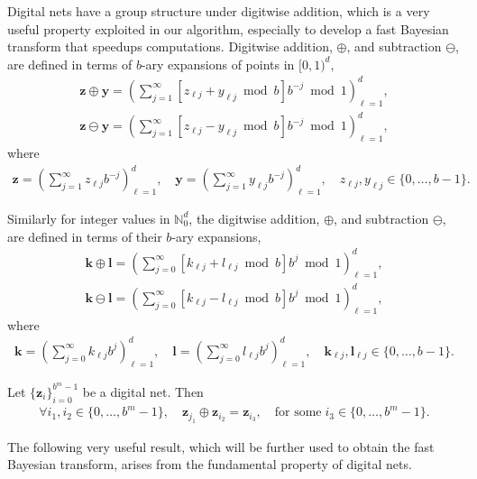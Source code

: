 \documentclass{svjour3}                     %
\newcommand{\bm}[1]{\boldsymbol{#1}}
\newcommand{\naturals}{\mathbb{N}}
\newcommand{\vk}{\bm{k}}
\newcommand{\vl}{\bm{l}}
\newcommand{\vy}{\bm{y}}
\newcommand{\vz}{\bm{z}}
\begin{document}
Digital nets have a group structure under digitwise addition, which is a very useful property exploited in our algorithm, especially to develop a fast Bayesian transform that speedups computations.
Digitwise addition, $\oplus$, and subtraction $\ominus$, are defined in terms of $b$-ary expansions of points in $[0, 1)^d$,
\begin{align*}
\vz \oplus \vy = \left( \sum_{j=1}^\infty [z_{\ell j} + y_{\ell j} \bmod b] b^{-j} \bmod 1 \right)_{\ell=1}^d,
\\
\vz \ominus \vy = \left( \sum_{j=1}^\infty [z_{\ell j} - y_{\ell j} \bmod b] b^{-j} \bmod 1 \right)_{\ell=1}^d,
\end{align*}
where
\begin{align*}
\vz = \left( \sum_{j=1}^{\infty} z_{\ell j}b^{-j}\right)_{\ell=1}^d, \quad
\vy = \left( \sum_{j=1}^{\infty} y_{\ell j}b^{-j}\right)_{\ell=1}^d, \quad
z_{\ell j}, y_{\ell j} \in \{0,\dots,b-1\}.
\end{align*}



Similarly for integer values in $\naturals_0^d$, the digitwise addition, $\oplus$, and subtraction $\ominus$, are defined in terms of their $b$-ary expansions,
\begin{align*}
\vk \oplus \vl = \left( \sum_{j=0}^\infty [k_{\ell j} + l_{\ell j} \bmod b] b^{j} \bmod 1 \right)_{\ell=1}^d,
\\
\vk \ominus \vl = \left( \sum_{j=0}^\infty [k_{\ell j} - l_{\ell j} \bmod b] b^{j} \bmod 1 \right)_{\ell=1}^d,
\end{align*}
where
\begin{align*}
\vk = \left( \sum_{j=0}^{\infty} k_{\ell j}b^{j}\right)_{\ell=1}^d, \quad
\vl = \left( \sum_{j=0}^{\infty} l_{\ell j}b^{j}\right)_{\ell=1}^d, \quad
\vk_{\ell j}, \vl_{\ell j} \in \{0,\dots,b-1\}.
\end{align*}

Let $\{\vz_i\}_{i=0}^{b^m-1}$ be a digital net. Then
\begin{align*}
\forall i_1, i_2 \in \{0,\dots,b^m-1\}, \quad \vz_{j_1} \oplus \vz_{i_2} = \vz_{i_3}, \quad \text{for some} \; i_3 \in \{0,\dots,b^m-1\}.
\end{align*}

The following very useful result, which will be further used to obtain the fast Bayesian transform, arises from the fundamental property of digital nets.
\end{document}
